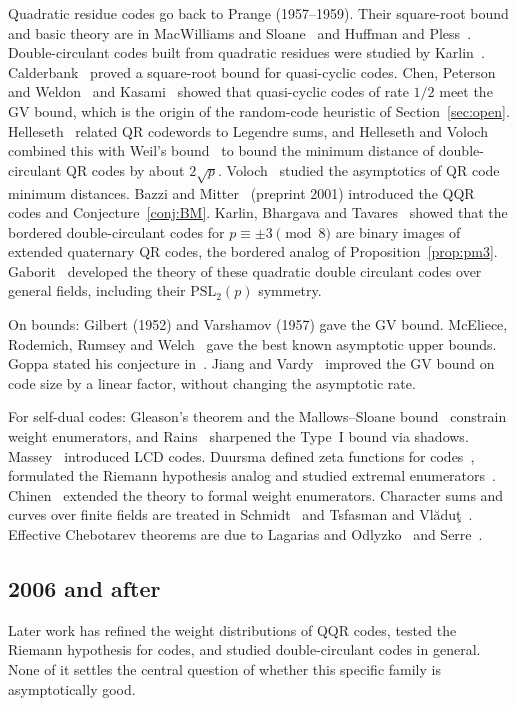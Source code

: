 \documentclass[12pt,letterpaper]{article}
\theoremstyle{definition}
\theoremstyle{remark}
\numberwithin{equation}{section}
\begin{document}
Quadratic residue codes go back to Prange (1957--1959). Their square-root bound and
basic theory are in MacWilliams and Sloane~\cite{MS77} and Huffman and
Pless~\cite{HP03}. Double-circulant codes built from quadratic residues were studied
by Karlin~\cite{Ka69}. Calderbank~\cite{Ca83} proved a square-root bound for
quasi-cyclic codes. Chen, Peterson and Weldon~\cite{CPW69} and Kasami~\cite{Ka74}
showed that quasi-cyclic codes of rate $1/2$ meet the GV bound, which is the origin
of the random-code heuristic of Section~\ref{sec:open}. Helleseth~\cite{He92}
related QR codewords to Legendre sums, and Helleseth and Voloch~\cite{HV04} combined
this with Weil's bound~\cite{We48} to bound the minimum distance of double-circulant
QR codes by about $2\sqrt p$. Voloch~\cite{Vo04} studied the asymptotics of QR code
minimum distances. Bazzi and Mitter~\cite{BM06} (preprint 2001) introduced the QQR
codes and Conjecture~\ref{conj:BM}. Karlin, Bhargava and Tavares~\cite{KBT78}
showed that the bordered double-circulant codes for $p\equiv\pm3\pmod 8$ are binary
images of extended quaternary QR codes, the bordered analog of
Proposition~\ref{prop:pm3}. Gaborit~\cite{Ga02} developed the theory of these
quadratic double circulant codes over general fields, including their
$\mathrm{PSL}_2(p)$ symmetry.

On bounds: Gilbert (1952) and Varshamov (1957) gave the GV bound. McEliece, Rodemich,
Rumsey and Welch~\cite{MRRW77} gave the best known asymptotic upper bounds. Goppa
stated his conjecture in~\cite{Go93}. Jiang and Vardy~\cite{JV04} improved the GV
bound on code size by a linear factor, without changing the asymptotic rate.

For self-dual codes: Gleason's theorem and the Mallows--Sloane bound~\cite{MS73}
constrain weight enumerators, and Rains~\cite{Ra98} sharpened the Type~I bound via
shadows. Massey~\cite{Ma92} introduced LCD codes. Duursma defined zeta functions
for codes~\cite{Du99,Du01}, formulated the Riemann hypothesis analog and studied
extremal enumerators~\cite{Du03}. Chinen~\cite{Ch05} extended the theory to formal
weight enumerators. Character sums and curves over finite fields are treated in
Schmidt~\cite{Sc04} and Tsfasman and Vl\u{a}du\c{t}~\cite{TV91}. Effective
Chebotarev theorems are due to Lagarias and Odlyzko~\cite{LO77} and Serre~\cite{Se81}.

\subsection{2006 and after}
Later work has refined the weight distributions of QQR codes, tested the Riemann
hypothesis for codes, and studied double-circulant codes in general. None of it
settles the central question of whether this specific family is asymptotically
good.
\end{document}
